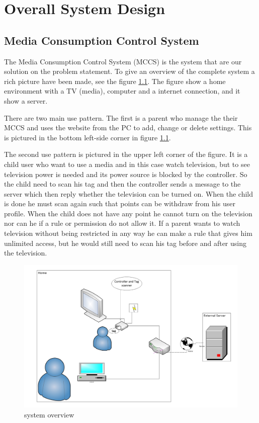 \chapter{Overall System Design}

\section{Media Consumption Control System} %
The Media Consumption Control System (MCCS) is the system that are our solution on the problem statement. To give an overview of the complete system a rich picture have been made, see the figure \ref{fig:systemoverview}. The figure show a home environment with a TV (media), computer and a internet connection, and it show a server. 

There are two main use pattern. The first is a parent who manage the their MCCS and uses the website from the PC to add, change or delete settings. This is pictured in the bottom left-side corner in figure \ref{fig:systemoverview}. 

The second use pattern is pictured in the upper left corner of the figure. It is a child user who want to use a media and in this case watch television, but to see television power is needed and its power source is blocked by the controller. So the child need to scan his tag and then the controller sends a message to the server which then reply whether the television can be turned on. When the child is done he must scan again such that points can be withdraw from his user profile. When the child does not have any point he cannot turn on the television nor can he if a rule or permission do not allow it. If a parent wants to watch television without being restricted in any way he can make a rule that gives him unlimited access, but he would still need to scan his tag before and after using the television.

\begin{figure}
	\centering
		\includegraphics[width=1.00\textwidth]{images/systemoverview.jpg}
	\caption{system overview}
	\label{fig:systemoverview}
\end{figure}

